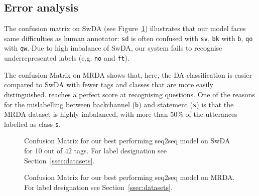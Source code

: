 \documentclass[letterpaper]{article} \usepackage{aaai20}  \usepackage{times}  \usepackage{helvet} \usepackage{courier}  \usepackage[hyphens]{url}  \usepackage{graphicx} \urlstyle{rm} \def\UrlFont{\rm}  \usepackage{graphicx}  \frenchspacing  \setlength{\pdfpagewidth}{8.5in}  \setlength{\pdfpageheight}{11in}
\begin{document}
\subsection{Error analysis}
The confusion matrix on SwDA (see Figure~\ref{fig:confusion-matrix}) illustrates that our model faces same difficulties as human annotator: \texttt{sd} is often confused with \texttt{sv}, \texttt{bk} with \texttt{b}, \texttt{qo} with \texttt{qw}. Due to high imbalance of SwDA, our system fails to recognise underrepresented labels (e.g. \texttt{no} and \texttt{ft}).

The confusion Matrix on MRDA shows that, here, the DA classification is easier compared to SwDA with fewer tags and classes that are more easily distinguished.  reaches a perfect score at recognising questions. One of the reasons for the mislabelling between backchannel (\texttt{b}) and statement (\texttt{s}) is that the MRDA dataset is highly imbalanced, with more than 50\% of the utterances labelled as class \texttt{s}.

\begin{figure}[htb!]
	  \caption{\label{fig:confusion-matrix} Confusion Matrix for our best performing seq2seq model on SwDA for 10 out of 42 tags. For label designation see Section~\ref{ssec:datasets}.}
\end{figure}
	
\begin{figure}[htb!]
  \caption{\label{fig:confusion-matrix_2} Confusion Matrix for our best performing seq2seq model on MRDA. For label designation see Section~\ref{ssec:datasets}.}
\end{figure}
\end{document}
